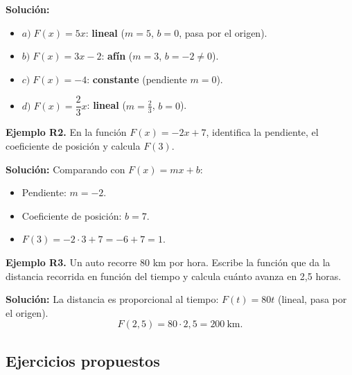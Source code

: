 \documentclass[12pt, letterpaper]{article}
\begin{document}
\begin{cuadrosolucion}
  \textbf{Solución:}
  \begin{itemize}
    \item $a) \; F(x) = 5x$: \textbf{lineal} ($m = 5$, $b = 0$, pasa por el origen).
    \item $b) \; F(x) = 3x - 2$: \textbf{afín} ($m = 3$, $b = -2 \neq 0$).
    \item $c) \; F(x) = -4$: \textbf{constante} (pendiente $m = 0$).
    \item $d) \; F(x) = \dfrac{2}{3}x$: \textbf{lineal} ($m = \frac{2}{3}$, $b = 0$).
  \end{itemize}
\end{cuadrosolucion}

\textbf{Ejemplo R2.} En la función $F(x) = -2x + 7$, identifica la pendiente, el coeficiente de posición y calcula $F(3)$.

\begin{cuadrosolucion}
  \textbf{Solución:} Comparando con $F(x) = mx + b$:
  \begin{itemize}
    \item Pendiente: $m = -2$.
    \item Coeficiente de posición: $b = 7$.
    \item $F(3) = -2 \cdot 3 + 7 = -6 + 7 = 1$.
  \end{itemize}
\end{cuadrosolucion}

\textbf{Ejemplo R3.} Un auto recorre 80 km por hora. Escribe la función que da la distancia recorrida en función del tiempo y calcula cuánto avanza en 2,5 horas.

\begin{cuadrosolucion}
  \textbf{Solución:} La distancia es proporcional al tiempo: $F(t) = 80t$ (lineal, pasa por el origen).
  $$F(2{,}5) = 80 \cdot 2{,}5 = 200\ \text{km}.$$
\end{cuadrosolucion}

\subsection{Ejercicios propuestos}
\end{document}
